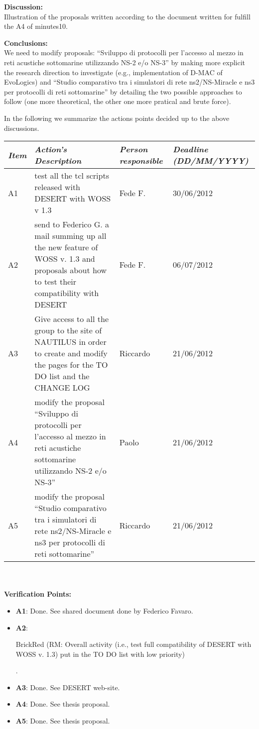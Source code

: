 \documentclass[11pt,journal,draftclsnofoot,onecolumn,twoside,letterpaper]{IEEEtran}
\newcommand{\RM}[1]{\begin{color}{BrickRed} (RM: #1) \end{color}}
\theoremstyle{definition} \newtheorem{definition}[]{Definition}
\theoremstyle{theorem} \newtheorem{theorem}[]{Theorem}
\begin{document}
{\bf Discussion:}\\
Illustration of the proposals written according to the document written for fulfill the A4 of minutes10. 

{\bf Conclusions:}\\
We need to modify proposals: ``Sviluppo di protocolli per l'accesso al mezzo in reti acustiche sottomarine utilizzando NS-2 e/o NS-3'' by making more explicit the research direction to investigate (e.g., implementation of D-MAC of EvoLogics) and ``Studio comparativo tra i simulatori di rete ns2/NS-Miracle e ns3 per protocolli di reti sottomarine'' by detailing the two possible approaches to follow (one more theoretical, the other one more pratical and brute force).

\newpage


In the following we summarize the actions points decided up to the above discussions. 

\begin{tabular}{|p{}|p{}|p{}|p{}|}
\hline
{\it Item} & {\it Action's Description} & {\it Person responsible} & {\it Deadline (DD/MM/YYYY)}\\
\hline
A1 & test all the tcl scripts released with DESERT with WOSS v 1.3 & Fede F. & 30/06/2012\\
A2 & send to Federico G. a mail summing up all the new feature of WOSS v. 1.3 and proposals about how to test their compatibility with DESERT & Fede F. & 06/07/2012 \\
A3 & Give access to all the group to the site of NAUTILUS in order to create and modify the pages for the TO DO list and the CHANGE LOG & Riccardo & 21/06/2012\\
A4 & modify the proposal ``Sviluppo di protocolli per l'accesso al mezzo in reti acustiche sottomarine utilizzando NS-2 e/o NS-3'' & Paolo & 21/06/2012\\
A5 & modify the proposal ``Studio comparativo tra i simulatori di rete ns2/NS-Miracle e ns3 per protocolli di reti sottomarine'' & Riccardo & 21/06/2012\\ 
\hline
\end{tabular}
\ \\
\ \\
{\bf Verification Points:}
\begin{itemize}
  \item {\bf A1}: Done. See shared document done by Federico Favaro.
  \item {\bf A2}: \RM{Overall activity (i.e., test full compatibility of DESERT with WOSS v. 1.3) put in the TO DO list with low priority}.
  \item {\bf A3}: Done. See DESERT web-site.
  \item {\bf A4}: Done. See thesis proposal.
  \item {\bf A5}: Done. See thesis proposal.
\end{itemize}
\end{document}
